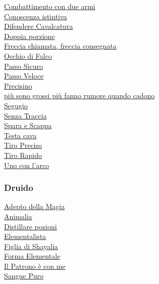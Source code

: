 \begin{multicols}{3}
{\begin{flushleft}
\hyperlink{Combattimento con due armi}{Combattimento con due armi}\\
\hyperlink{Conoscenza istintiva}{Conoscenza istintiva}\\
\hyperlink{Difendere Cavalcatura}{Difendere Cavalcatura}\\
\hyperlink{Doppia porzione}{Doppia porzione}\\
\hyperlink{Freccia chiamata, freccia consegnata}{Freccia chiamata, freccia consegnata}\\
\hyperlink{Occhio di Falco}{Occhio di Falco}\\
\hyperlink{Passo Sicuro}{Passo Sicuro}\\
\hyperlink{abPasso Veloce}{Passo Veloce}\\
\hyperlink{Precisino}{Precisino}\\
\hyperlink{più sono grossi più fanno rumore quando cadono}{più sono grossi più fanno rumore quando cadono}\\
\hyperlink{Segugio}{Segugio}\\
\hyperlink{Senza Traccia}{Senza Traccia}\\
\hyperlink{Spara e Scappa}{Spara e Scappa}\\
\hyperlink{Testa cava}{Testa cava}\\
\hyperlink{Tiro Preciso}{Tiro Preciso}\\
\hyperlink{Tiro Rapido}{Tiro Rapido}\\
\hyperlink{Uno con l'arco}{Uno con l'arco}

\titlespacing*{\subsubsection}{0pt}{0.5em}{0.5em}\subsubsection*{Druido}

\hyperlink{Adepto della Magia}{Adepto della Magia}\\
\hyperlink{Animalia}{Animalia}\\
\hyperlink{Distillare pozioni}{Distillare pozioni}\\
\hyperlink{Elementalista}{Elementalista}\\
\hyperlink{Figlia di Shayalia}{Figlia di Shayalia}\\
\hyperlink{Forma Elementale}{Forma Elementale}\\
\hyperlink{Il Patrono è con me}{Il Patrono è con me}\\
\hyperlink{Sangue Puro}{Sangue Puro}


\end{flushleft}}
\end{multicols}
